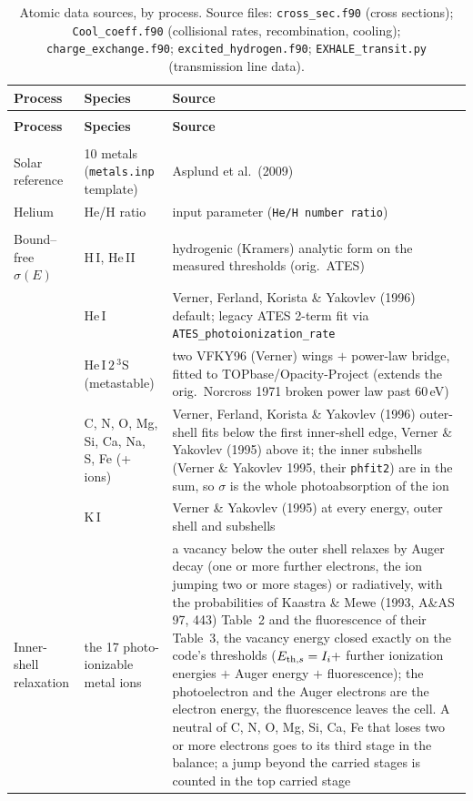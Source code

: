 \documentclass[english,a4paper]{my_memo}
\begin{document}
\begin{longtable}{@{}>{\raggedright\arraybackslash\hyphenpenalty=10000\exhyphenpenalty=10000}p{}p{}p{}@{}}
\caption{Atomic data sources, by process. Source files:
\texttt{cross\_sec.f90} (cross sections); \texttt{Cool\_coeff.f90} (collisional
rates, recombination, cooling); \texttt{charge\_exchange.f90};
\texttt{excited\_hydrogen.f90}; \texttt{EXHALE\_transit.py} (transmission line
data).}\label{tab:data}\\
\toprule
\textbf{Process} & \textbf{Species} & \textbf{Source} \\
\midrule
\endfirsthead
\multicolumn{3}{l}{\small\itshape Table~\ref{tab:data}, continued}\\
\toprule \textbf{Process} & \textbf{Species} & \textbf{Source} \\ \midrule
\endhead
\bottomrule
\endfoot
\multicolumn{3}{@{}l}{\textbf{Elemental abundances}}\\[2pt]
Solar reference & 10 metals (\texttt{metals.inp} template) & Asplund et al.\ (2009) \\
Helium & He/H ratio & input parameter (\texttt{He/H number ratio}) \\
\midrule
\multicolumn{3}{@{}l}{\textbf{Photoionization cross sections}}\\[2pt]
Bound--free $\sigma(E)$ & H\,I, He\,II & hydrogenic (Kramers) analytic form on the measured thresholds (orig.\ ATES) \\
 & He\,I & Verner, Ferland, Korista \& Yakovlev (1996) default; legacy ATES 2-term fit via \texttt{ATES\_photoionization\_rate} \\
 & He\,I\,$2\,^3$S (metastable) & two VFKY96 (Verner) wings $+$ power-law bridge, fitted to TOPbase/Opacity-Project (extends the orig.\ Norcross 1971 broken power law past 60\,eV) \\
 & C, N, O, Mg, Si, Ca, Na, S, Fe (+ ions) & Verner, Ferland, Korista \& Yakovlev (1996) outer-shell fits below the first inner-shell edge, Verner \& Yakovlev (1995) above it; the inner subshells (Verner \& Yakovlev 1995, their \texttt{phfit2}) are in the sum, so $\sigma$ is the whole photoabsorption of the ion \\
 & K\,I & Verner \& Yakovlev (1995) at every energy, outer shell and subshells \\
Inner-shell relaxation & the 17 photo-ionizable metal ions & a vacancy below the outer shell relaxes by Auger decay (one or more further electrons, the ion jumping two or more stages) or radiatively, with the probabilities of Kaastra \& Mewe (1993, A\&AS 97, 443) Table~2 and the fluorescence of their Table~3, the vacancy energy closed exactly on the code's thresholds ($E_{{\rm th},s}=I_i+$ further ionization energies $+$ Auger energy $+$ fluorescence); the photoelectron and the Auger electrons are the electron energy, the fluorescence leaves the cell. A neutral of C, N, O, Mg, Si, Ca, Fe that loses two or more electrons goes to its third stage in the balance; a jump beyond the carried stages is counted in the top carried stage \\

\end{longtable}
\end{document}
